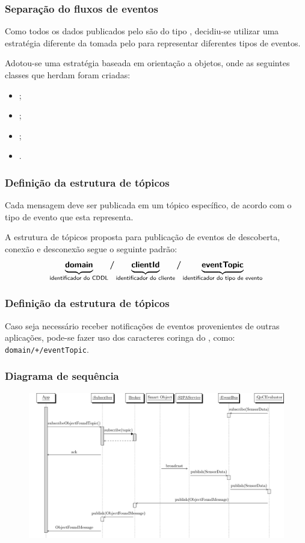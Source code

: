 \documentclass[aspectratio=169]{beamer}
\begin{document}
\begin{frame}
	\frametitle{Separação do fluxos de eventos}
	Como todos os dados publicados pelo \cddl são do tipo \msg, decidiu-se utilizar uma estratégia diferente da tomada pelo \stwopa para representar diferentes tipos de eventos.

	\bigskip

	Adotou-se uma estratégia baseada em orientação a objetos, onde as seguintes classes que herdam \msg foram criadas:
	\begin{itemize}
		\item \objfoundmsg;
		\item \objconnectedmsg;
		\item \objdisconnectedmsg;
		\item \sensordatamsg.
	\end{itemize}
\end{frame}

\begin{frame}
	\frametitle{Definição da estrutura de tópicos}
	Cada mensagem deve ser publicada em um tópico específico, de acordo com o tipo de evento que esta representa.

	\bigskip

	A estrutura de tópicos proposta para publicação de eventos de descoberta, conexão e desconexão segue o seguinte padrão:
	\[
		\underbrace{\bm{\mathsf{domain}}\vphantom{p}}_{\text{\textsf{identificador do CDDL}}}
		\bm{/}
		\underbrace{\bm{\mathsf{clientId}}\vphantom{p}}_{\text{\textsf{identificador do cliente}}}
		\bm{/}
		\underbrace{\bm{\mathsf{eventTopic}}}_{\text{\textsf{identificador do tipo de evento}}}
	\]
\end{frame}

\begin{frame}
	\frametitle{Definição da estrutura de tópicos}
	Caso seja necessário receber notificações de eventos provenientes de outras aplicações, pode-se fazer uso dos caracteres coringa do \mqtt, como:
	\texttt{domain/+/eventTopic}.
\end{frame}

\begin{frame}
	\frametitle{Diagrama de sequência}
	\begin{figure}
		\centering
		\includegraphics[width=.85\linewidth]{img/solution-sequence.pdf}
	\end{figure}
\end{frame}
\end{document}
